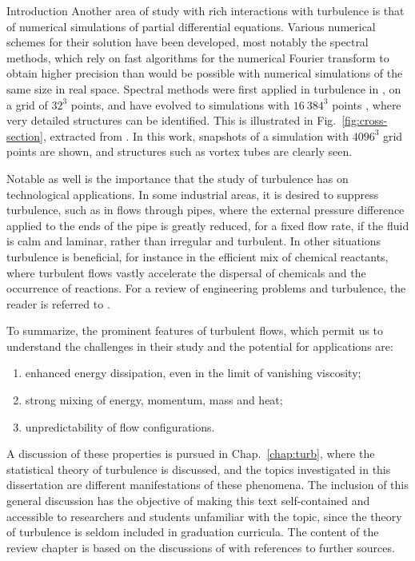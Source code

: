 \begin{chapter}{Introduction}
Another area of study with rich interactions with turbulence
is that of numerical simulations of partial differential equations.
Various numerical schemes for their solution have been developed, most notably the spectral methods,
which rely on fast algorithms for the numerical Fourier transform
to obtain higher precision than would be possible with
numerical simulations of the same size in real space.
Spectral methods were first applied in turbulence in \textcite{orszag1972},
on a grid of $32^3$ points, and have evolved
to simulations with $16\ 384^3$ points \parencite{iyer2019},
where very detailed structures can be identified. This is illustrated in Fig.~\ref{fig:cross-section}, extracted from \textcite{ishihara2009}. In this work, snapshots of a simulation with $4096^3$ grid points are shown, and structures such as vortex tubes are clearly seen.

Notable as well is the importance that the study of turbulence has
on technological applications. In some industrial areas, it is desired to suppress turbulence, such as in flows through pipes, where the external pressure difference applied to the ends of the pipe is greatly reduced, for a fixed flow rate,
if the fluid is calm and laminar, rather than irregular and turbulent.
In other situations turbulence is beneficial, for instance in the efficient
mix of chemical reactants, where turbulent flows vastly accelerate
the dispersal of chemicals and the occurrence of reactions.
For a review of engineering problems and turbulence, the reader
is referred to \textcite{dewan2010,ting2016}.

To summarize, the prominent features of turbulent flows, which permit us to understand the challenges in their study and the potential for applications are:
\begin{enumerate}
\item enhanced energy dissipation, even in the limit of vanishing viscosity;
\item strong mixing of energy, momentum, mass and heat;
\item unpredictability of flow configurations.
\end{enumerate}
A discussion of these properties is pursued in Chap.~\ref{chap:turb}, where the statistical theory of turbulence is discussed, and the topics investigated in this dissertation are different manifestations of these phenomena. The inclusion of this general discussion has the objective of making this text self-contained and accessible to researchers and students unfamiliar with the topic, since the theory of turbulence is seldom included in graduation curricula. The content of the review chapter is based on the discussions of
\textcite{frisch1995,foias2001navier,moriconi2008introducao,eyink2008turbulence} with references to further sources.


\end{chapter}
